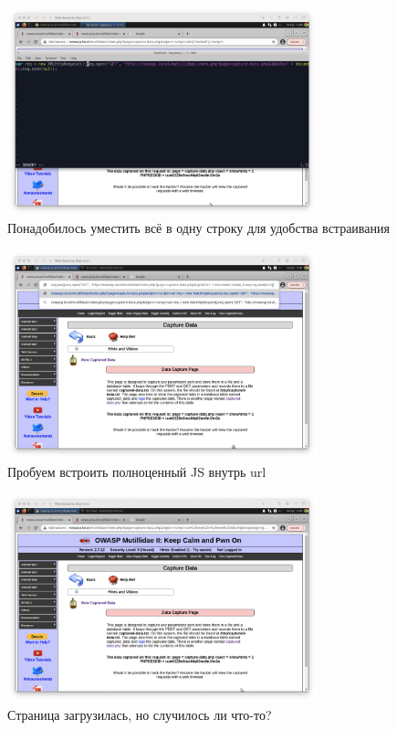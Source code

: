 \documentclass[a4paper]{article}
\begin{document}
  \begin{figure}[H]
    \centering
    \includegraphics[width=0.8\textwidth]{step_00024}
    \caption{Понадобилось уместить всё в одну строку для удобства встраивания}
  \end{figure}

  \begin{figure}[H]
    \centering
    \includegraphics[width=0.8\textwidth]{step_00025}
    \caption{Пробуем встроить полноценный JS внутрь url}
  \end{figure}

  \begin{figure}[H]
    \centering
    \includegraphics[width=0.8\textwidth]{step_00026}
    \caption{Страница загрузилась, но случилось ли что-то?}
  \end{figure}
\end{document}
